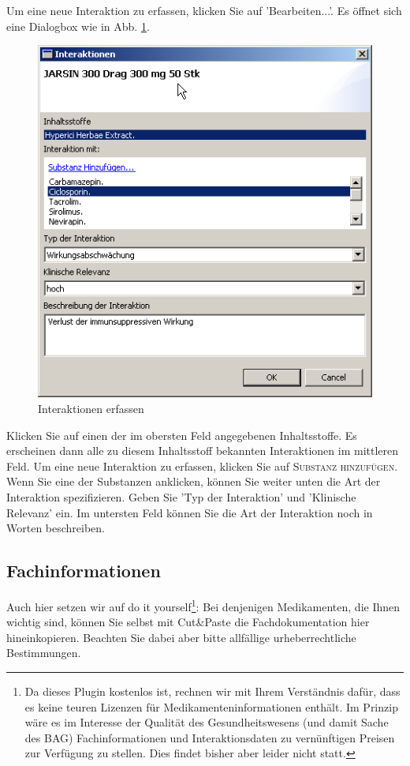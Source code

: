 \documentclass[a4paper]{scrartcl}
\begin{document}
Um eine neue Interaktion zu erfassen, klicken Sie auf 'Bearbeiten...'. Es öffnet sich eine Dialogbox wie in Abb. \ref{fig:baginterakt}.
\begin{figure}[ht]
    \begin{centering}
    \includegraphics{interakt1}
    \caption{Interaktionen erfassen}
    \label {fig:baginterakt}
    \end{centering}
\end{figure}
Klicken Sie auf einen der im obersten Feld angegebenen Inhaltsstoffe. Es erscheinen dann alle zu diesem Inhaltsstoff bekannten Interaktionen im mittleren Feld. Um eine neue Interaktion zu erfassen, klicken Sie auf \textsc{Substanz hinzufügen}. Wenn Sie eine der Substanzen anklicken, können Sie weiter unten die Art der Interaktion spezifizieren. Geben Sie 'Typ der Interaktion' und 'Klinische Relevanz' ein. Im untersten Feld können Sie die Art der Interaktion noch in Worten beschreiben.

\subsection{Fachinformationen}
Auch hier setzen wir auf \glqq{}do it yourself\grqq{}\footnote{Da dieses Plugin kostenlos ist, rechnen wir mit Ihrem Verständnis dafür, dass es keine teuren Lizenzen für Medikamenteninformationen enthält. Im Prinzip wäre es im Interesse der Qualität des Gesundheitswesens (und damit Sache des BAG) Fachinformationen und Interaktionsdaten zu vernünftigen Preisen zur Verfügung zu stellen. Dies findet bisher aber leider nicht statt.}: Bei denjenigen Medikamenten, die Ihnen wichtig sind, können Sie selbst mit Cut\&Paste die Fachdokumentation hier hineinkopieren. Beachten Sie dabei aber bitte allfällige urheberrechtliche Bestimmungen.
\end{document}
